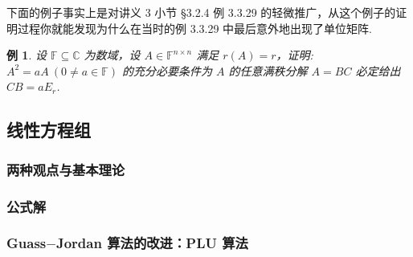 \documentclass[10pt,openany]{article}
\theoremstyle{thmstyle} %
\theoremstyle{defstyle} %
\theoremstyle{prostyle} %
\theoremstyle{exastyle}
\newtheorem{example}[theorem]{例}
\theoremstyle{remstyle}
\newcommand{\F}{\mathbb{F}}
\newcommand{\C}{\mathbb{C}}
\newcommand{\n}{^{n \times n}}
\begin{document}
下面的例子事实上是对讲义 3 小节 \S 3.2.4  例 3.3.29 的轻微推广，从这个例子的证明过程你就能发现为什么在当时的例 3.3.29 中最后意外地出现了单位矩阵.

\begin{example}
	设 \( \F \subseteq \C \) 为数域，设 \( A \in \F\n \) 满足 \( r(A)=r \)，证明: \( A^2=aA \ (0 \neq a \in \F) \) 的充分必要条件为 \( A \) 的任意满秩分解 \( A=BC \) 必定给出 \( CB=aE_r \).
\end{example}

\subsection{线性方程组}

\subsubsection{两种观点与基本理论}

\subsubsection{公式解}

\subsubsection{Guass\(-\)Jordan 算法的改进：PLU 算法}
\end{document}
